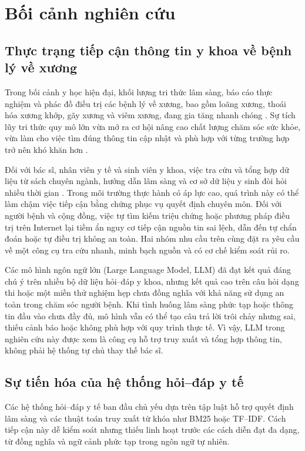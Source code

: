 \section{Bối cảnh nghiên cứu}

\subsection{Thực trạng tiếp cận thông tin y khoa về bệnh lý về xương}

Trong bối cảnh y học hiện đại, khối lượng tri thức lâm sàng, báo cáo thực nghiệm và phác đồ điều trị các bệnh lý về xương, bao gồm loãng xương, thoái hóa xương khớp, gãy xương và viêm xương, đang gia tăng nhanh chóng \cite{who2022musculoskeletal}. Sự tích lũy tri thức quy mô lớn vừa mở ra cơ hội nâng cao chất lượng chăm sóc sức khỏe, vừa làm cho việc tìm đúng thông tin cập nhật và phù hợp với từng trường hợp trở nên khó khăn hơn \cite{medrag2024}.

Đối với bác sĩ, nhân viên y tế và sinh viên y khoa, việc tra cứu và tổng hợp dữ liệu từ sách chuyên ngành, hướng dẫn lâm sàng và cơ sở dữ liệu y sinh đòi hỏi nhiều thời gian \cite{ortho_rag_13}. Trong môi trường thực hành có áp lực cao, quá trình này có thể làm chậm việc tiếp cận bằng chứng phục vụ quyết định chuyên môn. Đối với người bệnh và cộng đồng, việc tự tìm kiếm triệu chứng hoặc phương pháp điều trị trên Internet lại tiềm ẩn nguy cơ tiếp cận nguồn tin sai lệch, dẫn đến tự chẩn đoán hoặc tự điều trị không an toàn. Hai nhóm nhu cầu trên cùng đặt ra yêu cầu về một công cụ tra cứu nhanh, minh bạch nguồn và có cơ chế kiểm soát rủi ro.

Các mô hình ngôn ngữ lớn (Large Language Model, LLM) đã đạt kết quả đáng chú ý trên nhiều bộ dữ liệu hỏi--đáp y khoa, nhưng kết quả cao trên câu hỏi dạng thi hoặc một miền thử nghiệm hẹp chưa đồng nghĩa với khả năng sử dụng an toàn trong chăm sóc người bệnh. Khi tình huống lâm sàng phức tạp hoặc thông tin đầu vào chưa đầy đủ, mô hình vẫn có thể tạo câu trả lời trôi chảy nhưng sai, thiếu cảnh báo hoặc không phù hợp với quy trình thực tế. Vì vậy, LLM trong nghiên cứu này được xem là công cụ hỗ trợ truy xuất và tổng hợp thông tin, không phải hệ thống tự chủ thay thế bác sĩ.

\subsection{Sự tiến hóa của hệ thống hỏi--đáp y tế}

Các hệ thống hỏi--đáp y tế ban đầu chủ yếu dựa trên tập luật hỗ trợ quyết định lâm sàng \cite{rule_based_1, rule_based_2} và các thuật toán truy xuất từ khóa như BM25 hoặc TF--IDF. Cách tiếp cận này dễ kiểm soát nhưng thiếu linh hoạt trước các cách diễn đạt đa dạng, từ đồng nghĩa và ngữ cảnh phức tạp trong ngôn ngữ tự nhiên.

